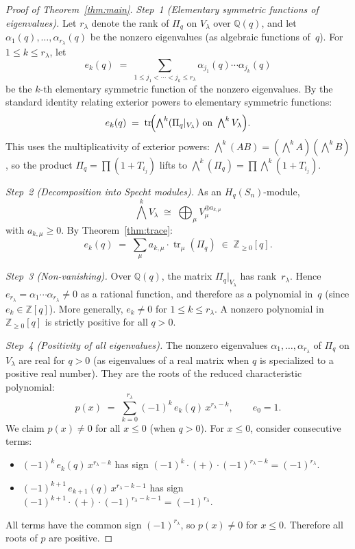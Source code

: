 \documentclass[11pt]{article}
\theoremstyle{definition}
\theoremstyle{remark}
\begin{document}
\begin{proof}[Proof of Theorem~\ref{thm:main}]
\emph{Step~1 (Elementary symmetric functions of eigenvalues).}
Let $r_\lambda$ denote the rank of $\Pi_q$ on $V_\lambda$ over
$\mathbb{Q}(q)$, and let $\alpha_1(q), \ldots, \alpha_{r_\lambda}(q)$
be the nonzero eigenvalues (as algebraic functions of~$q$).
For $1 \leq k \leq r_\lambda$, let
\[
  e_k(q) \;=\; \sum_{1 \leq j_1 < \cdots < j_k \leq r_\lambda}
    \alpha_{j_1}(q) \cdots \alpha_{j_k}(q)
\]
be the $k$-th elementary symmetric function of the nonzero eigenvalues.
By the standard identity relating exterior powers to elementary
symmetric functions:
\[
  e_k(q) \;=\; \operatorname{tr}\!\Bigl(
    \textstyle\bigwedge^k(\Pi_q|_{V_\lambda})
    \text{ on } \bigwedge^k V_\lambda
  \Bigr).
\]
This uses the multiplicativity of exterior powers:
$\bigwedge^k(AB) = (\bigwedge^k A)(\bigwedge^k B)$, so
the product $\Pi_q = \prod(1 + T_{i_j})$ lifts to
$\bigwedge^k(\Pi_q) = \prod \bigwedge^k(1 + T_{i_j})$.

\emph{Step~2 (Decomposition into Specht modules).}
As an $H_q(S_n)$-module,
\[
  \textstyle\bigwedge^k V_\lambda
  \;\cong\; \bigoplus_\mu V_\mu^{\oplus a_{k,\mu}}
\]
with $a_{k,\mu} \geq 0$.
By Theorem~\ref{thm:trace}:
\[
  e_k(q) \;=\; \sum_\mu a_{k,\mu} \cdot \operatorname{tr}_\mu(\Pi_q)
  \;\in\; \mathbb{Z}_{\geq 0}[q].
\]

\emph{Step~3 (Non-vanishing).}
Over $\mathbb{Q}(q)$, the matrix $\Pi_q|_{V_\lambda}$ has rank~$r_\lambda$.
Hence $e_{r_\lambda} = \alpha_1 \cdots \alpha_{r_\lambda} \neq 0$ as a
rational function, and therefore as a polynomial in~$q$
(since $e_k \in \mathbb{Z}[q]$).  More generally, $e_k \neq 0$
for $1 \leq k \leq r_\lambda$.
A nonzero polynomial in $\mathbb{Z}_{\geq 0}[q]$ is strictly positive
for all $q > 0$.

\emph{Step~4 (Positivity of all eigenvalues).}
The nonzero eigenvalues $\alpha_1, \ldots, \alpha_{r_\lambda}$ of
$\Pi_q$ on $V_\lambda$ are real for $q > 0$ (as eigenvalues of a
real matrix when $q$ is specialized to a positive real number).
They are the roots of the reduced characteristic polynomial:
\[
  p(x) \;=\; \sum_{k=0}^{r_\lambda} (-1)^k\, e_k(q)\, x^{r_\lambda - k},
  \qquad e_0 = 1.
\]
We claim $p(x) \neq 0$ for all $x \leq 0$ (when $q > 0$).
For $x \leq 0$, consider consecutive terms:
\begin{itemize}
\item $(-1)^k\, e_k(q)\, x^{r_\lambda - k}$
  has sign $(-1)^k \cdot (+) \cdot (-1)^{r_\lambda - k}
  = (-1)^{r_\lambda}$.
\item $(-1)^{k+1}\, e_{k+1}(q)\, x^{r_\lambda - k - 1}$
  has sign $(-1)^{k+1} \cdot (+) \cdot (-1)^{r_\lambda - k - 1}
  = (-1)^{r_\lambda}$.
\end{itemize}
All terms have the common sign $(-1)^{r_\lambda}$, so
$p(x) \neq 0$ for $x \leq 0$.
Therefore all roots of $p$ are positive.
\end{proof}
\end{document}

